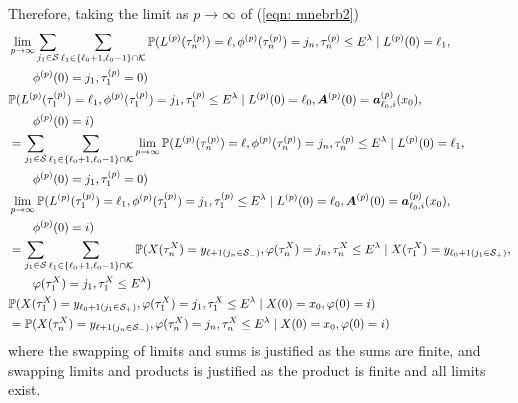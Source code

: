 Therefore, taking the limit as \(p\to \infty \) of (\ref{eqn: mnebrb2}) 
\begin{align}
	&\lim_{p\to\infty}\sum_{j_1\in\mathcal S}\sum_{\ell_1\in\{\ell_0+1,\ell_0-1\}\cap \mathcal K}\mathbb P(L^{(p)}(\tau_n^{(p)}) = \ell, \phi^{(p)}(\tau_n^{(p)}) = j_n, \tau_{n}^{(p)}\leq E^\lambda 
	 \mid L^{(p)}(0)=\ell_1, \nonumber
	  \\&\qquad  \phi^{(p)}(0)=j_1, 
	 \tau_1^{(p)}=0) \nonumber 
	 \\& \mathbb P(L^{(p)}(\tau_1^{(p)})=\ell_1, \phi^{(p)}(\tau_1^{(p)}) = j_1, \tau_{1}^{(p)}\leq E^\lambda
	 \mid L^{(p)}(0)=\ell_0, \boldsymbol A^{(p)}(0)=\boldsymbol  a_{\ell_0,i}^{(p)}(x_0), \nonumber 
	 \\&\qquad \phi^{(p)}(0)=i) \nonumber
	 \\&= \sum_{j_1\in\mathcal S}\sum_{\ell_1\in\{\ell_0+1,\ell_0-1\}\cap \mathcal K} \lim_{p\to\infty} \mathbb P(L^{(p)}(\tau_n^{(p)}) = \ell, \phi^{(p)}(\tau_n^{(p)}) = j_n, \tau_{n}^{(p)}\leq E^\lambda 
	 \mid L^{(p)}(0)=\ell_1, \nonumber
	  \\&\qquad  \phi^{(p)}(0)=j_1, \tau_1^{(p)}=0) \nonumber
	 \\& \lim_{p\to\infty}\mathbb P(L^{(p)}(\tau_1^{(p)})=\ell_1, \phi^{(p)}(\tau_1^{(p)}) = j_1, \tau_{1}^{(p)}\leq E^\lambda
	 \mid L^{(p)}(0)=\ell_0, \boldsymbol A^{(p)}(0)=\boldsymbol  a_{\ell_0,i}^{(p)}(x_0),\nonumber
	 \\&\qquad \phi^{(p)}(0)=i)\nonumber
	 \\&= \sum_{j_1\in\mathcal S}\sum_{\ell_1\in\{\ell_0+1,\ell_0-1\}\cap \mathcal K} \mathbb P(X(\tau_n^X) = y_{\ell+1(j_{n}\in\mathcal S_-)}, 
		\varphi(\tau_n^X) = j_n, \tau_{n}^X\leq E^\lambda \mid X(\tau_1^X)=y_{\ell_{0}+1(j_{1}\in\mathcal S_+)},\nonumber
		\\&\qquad{} \varphi(\tau_1^X)=j_{1},\tau_1^X\leq E^\lambda) \nonumber
	 \\& \mathbb P(X(\tau_1^X)=y_{\ell_{0}+1(j_{1}\in\mathcal S_+)},
		\varphi(\tau_1^X)=j_{1},\tau_1^X\leq E^\lambda
		\mid X(0)=x_0, \varphi(0)=i) \nonumber
	\\&=\mathbb P(X(\tau_n^X) = y_{\ell+1(j_{n}\in\mathcal S_-)}, 
		\varphi(\tau_n^X) = j_n, \tau_{n}^X\leq E^\lambda
		\mid X(0)=x_0, \varphi(0)=i)
	 \label{eqn: mnebrb22}
\end{align}
where the swapping of limits and sums is justified as the sums are finite, and swapping limits and products is justified as the product is finite and all limits exist. 

